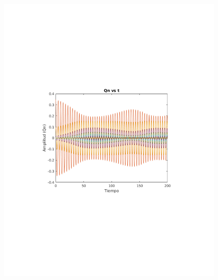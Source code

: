 \documentclass[10pt,a4paper]{article}
\begin{document}
\begin{figure}[h!]
\centering 
\includegraphics[scale=0.8]{Qn1.pdf}
\end{figure}
\end{document}
